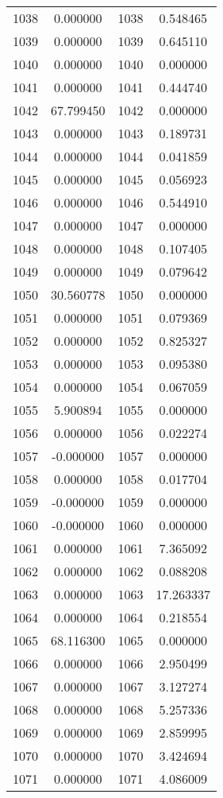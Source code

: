 \documentclass[12pt]{article}
\begin{document}
\begin{longtable}{@{}cccc@{}}
1038 & 0.000000 & 1038 & 0.548465 \\
1039 & 0.000000 & 1039 & 0.645110 \\
1040 & 0.000000 & 1040 & 0.000000 \\
1041 & 0.000000 & 1041 & 0.444740 \\
1042 & 67.799450 & 1042 & 0.000000 \\
1043 & 0.000000 & 1043 & 0.189731 \\
1044 & 0.000000 & 1044 & 0.041859 \\
1045 & 0.000000 & 1045 & 0.056923 \\
1046 & 0.000000 & 1046 & 0.544910 \\
1047 & 0.000000 & 1047 & 0.000000 \\
1048 & 0.000000 & 1048 & 0.107405 \\
1049 & 0.000000 & 1049 & 0.079642 \\
1050 & 30.560778 & 1050 & 0.000000 \\
1051 & 0.000000 & 1051 & 0.079369 \\
1052 & 0.000000 & 1052 & 0.825327 \\
1053 & 0.000000 & 1053 & 0.095380 \\
1054 & 0.000000 & 1054 & 0.067059 \\
1055 & 5.900894 & 1055 & 0.000000 \\
1056 & 0.000000 & 1056 & 0.022274 \\
1057 & -0.000000 & 1057 & 0.000000 \\
1058 & 0.000000 & 1058 & 0.017704 \\
1059 & -0.000000 & 1059 & 0.000000 \\
1060 & -0.000000 & 1060 & 0.000000 \\
1061 & 0.000000 & 1061 & 7.365092 \\
1062 & 0.000000 & 1062 & 0.088208 \\
1063 & 0.000000 & 1063 & 17.263337 \\
1064 & 0.000000 & 1064 & 0.218554 \\
1065 & 68.116300 & 1065 & 0.000000 \\
1066 & 0.000000 & 1066 & 2.950499 \\
1067 & 0.000000 & 1067 & 3.127274 \\
1068 & 0.000000 & 1068 & 5.257336 \\
1069 & 0.000000 & 1069 & 2.859995 \\
1070 & 0.000000 & 1070 & 3.424694 \\
1071 & 0.000000 & 1071 & 4.086009 \\

\end{longtable}
\end{document}
